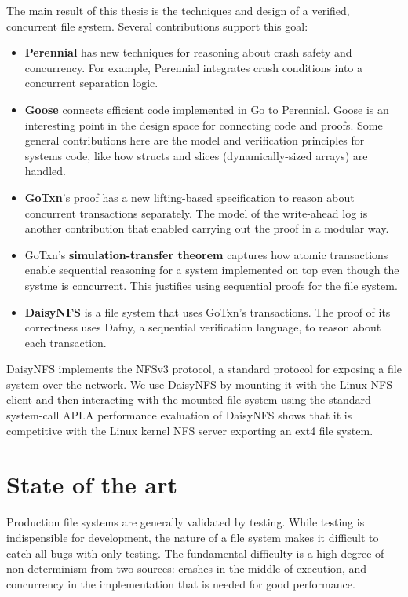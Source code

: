 The main result of this thesis is the techniques and design of a verified,
concurrent file system. Several contributions support this goal:
\begin{itemize}
  \item \textbf{Perennial} has new techniques for reasoning about crash safety
    and concurrency. For example, Perennial integrates crash conditions into a
    concurrent separation logic.
  \item \textbf{Goose} connects efficient code implemented in Go to Perennial.
    Goose is an interesting point in the design space for connecting code
    and proofs. Some general contributions here are the model and
    verification principles for systems code, like how structs and slices
    (dynamically-sized arrays) are handled.
  \item \textbf{GoTxn}'s proof has a new lifting-based specification to reason
    about concurrent transactions separately. The model of the write-ahead
    log is another contribution that enabled carrying out the proof in a modular
    way.
  \item GoTxn's \textbf{simulation-transfer theorem} captures how atomic
    transactions enable sequential reasoning for a system implemented on top
    even though the systme is concurrent. This justifies using sequential proofs
    for the file system.
  \item \textbf{DaisyNFS} is a file system that uses GoTxn's transactions. The
    proof of its correctness uses Dafny, a
    sequential verification language, to reason about each transaction.
\end{itemize}

DaisyNFS implements the NFSv3 protocol, a standard protocol for exposing
a file system over the network. We use DaisyNFS by mounting it with the
Linux NFS client and then interacting with the mounted file system using
the standard system-call API.\@ A performance evaluation of DaisyNFS shows
that it is competitive with the Linux kernel NFS server exporting an
ext4 file system.

\section{State of the art}

Production file systems are generally validated by testing. While testing is
indispensible for development, the nature of a file system makes it difficult to
catch all bugs with only testing. The fundamental difficulty is a high degree of
non-determinism from two sources: crashes in the middle of execution, and
concurrency in the implementation that is needed for good performance.

